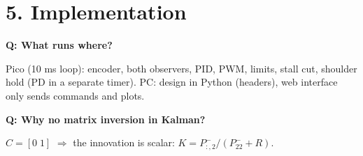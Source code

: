 \documentclass[9pt,a4paper,twocolumn]{extarticle}
\newcommand{\q}[1]{\par\smallskip\noindent\textbf{Q: #1}\par\noindent}
\begin{document}
\section{5. Implementation}
\q{What runs where?}
Pico (10 ms loop): encoder, both observers, PID, PWM, limits, stall cut, shoulder hold (PD in a separate timer). PC: design in Python (headers), web interface only sends commands and plots.
\q{Why no matrix inversion in Kalman?}
$C=[0\;1]$ $\Rightarrow$ the innovation is scalar: $K=P^-_{:,2}/(P^-_{22}+R)$.
\end{document}
